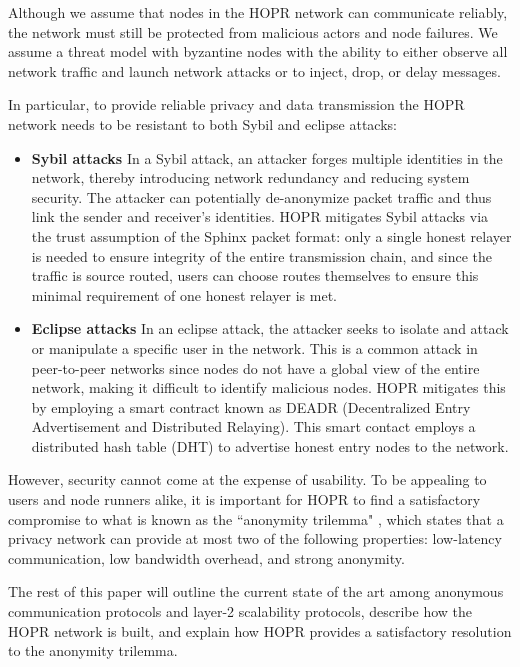 Although we assume that nodes in the HOPR network can communicate reliably, the
network must still be protected from malicious actors and node failures. We assume a
threat model with byzantine nodes with the ability to either observe all network
traffic and launch network attacks or to inject, drop, or delay messages.

In particular, to provide reliable privacy and data transmission the HOPR network needs to be resistant to both Sybil and eclipse attacks:

\begin{itemize}
    \item \textbf{Sybil attacks} In a Sybil attack, an attacker forges
    multiple identities in the network, thereby introducing network redundancy and
    reducing system security. The attacker can potentially de-anonymize packet traffic and thus link the sender and receiver's identities. HOPR mitigates Sybil attacks via the trust assumption of the Sphinx packet format: only a single honest relayer is needed to ensure integrity of the entire transmission chain, and since the traffic is source routed, users can choose routes themselves to ensure this minimal requirement of one honest relayer is met. 
    \item \textbf{Eclipse attacks} In an eclipse attack, the attacker seeks to isolate and attack or
    manipulate a specific user in the network. This is a common
    attack in peer-to-peer networks since nodes do not have a global view of the entire network, making it difficult to identify
    malicious nodes. HOPR mitigates this by employing a smart contract known as DEADR (Decentralized Entry Advertisement and Distributed Relaying). This smart contact employs a distributed hash table (DHT) to advertise honest entry nodes to the network.
    
\end{itemize}
However, security cannot come at the expense of usability. To be appealing to users and node runners alike, it is important for HOPR to find a satisfactory compromise to what is known as the ``anonymity trilemma" \cite{AnonymityTrilemma}, which states that a privacy network can provide at most two of the following properties: low-latency
communication, low bandwidth overhead, and strong anonymity.

The rest of this paper will outline the current state of the art among anonymous communication protocols and layer-2 scalability protocols, describe how the HOPR network is built, and explain how HOPR provides a satisfactory resolution to the anonymity trilemma. 

